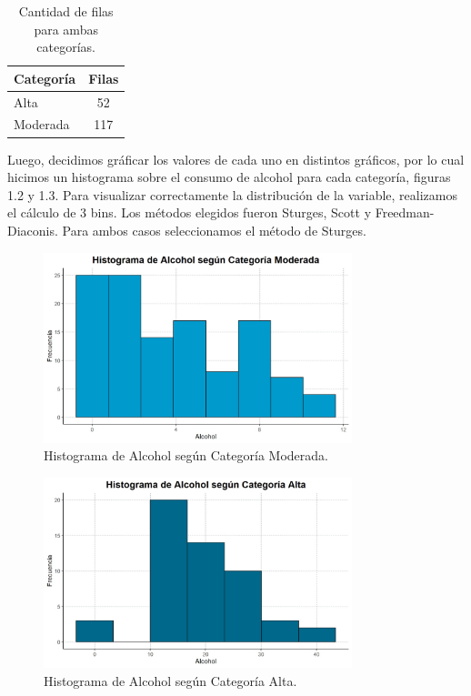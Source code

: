 \documentclass{article} %
\begin{document}
\begin{table}[H]
	\centering
		\begin{tabular}{||l | c ||}
			\hline
			\hline
			Categoría & 	Filas\\
			\hline			
			\hline
			Alta & 52\\
			\hline
			Moderada & 117\\
			\hline
			\hline
		\end{tabular}
		\caption{Cantidad de filas para ambas categorías.}
	\label{tab:table-punto-1-4}
\end{table}

Luego, decidimos gráficar los valores de cada uno en distintos gráficos, por lo cual hicimos un histograma sobre el consumo de alcohol para cada categoría, figuras 1.2 y 1.3. Para visualizar correctamente la distribución de la variable, realizamos el cálculo de 3 bins. Los métodos elegidos fueron Sturges, Scott y Freedman-Diaconis. Para ambos casos seleccionamos el método de Sturges.

\begin{figure}[H]
	\centering
	\includegraphics[width=0.8\textwidth]{images/1-4 hist 1}
	\caption{Histograma de Alcohol según Categoría Moderada.}
	\label{fig:hist1}
\end{figure}

\begin{figure}[H]
	\centering
	\includegraphics[width=0.8\textwidth]{images/1-4 hist 2}
	\caption{Histograma de Alcohol según Categoría Alta.}
	\label{fig:hist2}
\end{figure}
\end{document}
